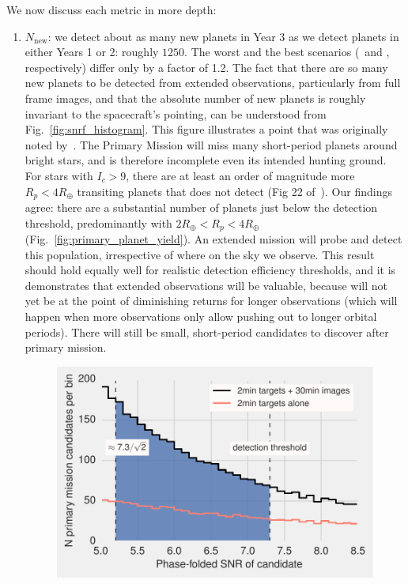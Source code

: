 We now discuss each metric in more depth:
\begin{enumerate}
	\item $N_\mathrm{new}$: we detect about as many new planets in Year 3 as we detect planets in either Years 1 or 2: roughly $1250$.
	The worst and the best scenarios (\elong\ and \hemis, respectively) differ only by a factor of 1.2.
	The fact that there are so many new planets to be detected from extended observations, particularly from full frame images, and that the absolute number of new planets is roughly invariant to the spacecraft's pointing, can be understood from Fig.~\ref{fig:snrf_histogram}.
	This figure illustrates a point that was originally noted by~.
        The \tesss Primary Mission will miss many short-period planets around bright stars, and is therefore
        incomplete even its intended hunting ground.
        For stars with $I_c>9$, there are at least an order of magnitude more $R_p<4R_\oplus$ transiting planets that \tess does not detect (Fig 22 of~).
	Our findings agree: there are a substantial number of planets just below the detection threshold, predominantly with $2R_\oplus < R_p <4R_\oplus$ (Fig.~\ref{fig:primary_planet_yield}).
	An extended mission will probe and detect this population, irrespective of where on the sky we observe.
	This result should hold equally well for realistic detection efficiency thresholds, and it is demonstrates that extended observations will be valuable, because \tess will not yet be at the point of diminishing returns for longer observations (which will happen when more observations only allow pushing out to longer orbital periods). 
	There will still be small, short-period candidates to discover after \tesss primary mission.
\begin{figure}[!t]
	\centering
	\includegraphics[scale=1.]{figures/snrf_histogram_with_ps.pdf}

\end{figure}
\end{enumerate}
